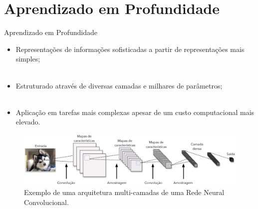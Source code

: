 \section{Aprendizado em Profundidade}
\label{s.deep_learning}

\begin{frame}{Aprendizado em Profundidade}
	\begin{itemize}
		\justifying
		\item Representações de informações sofisticadas a partir de representações mais simples;
		\\~\\
		\item Estruturado através de diversas camadas e milhares de parâmetros;
		\\~\\
		\item Aplicação em tarefas mais complexas apesar de um custo computacional mais elevado.
	\end{itemize}
\end{frame}

\begin{frame}
	\begin{figure}
		\centering
		\includegraphics[scale=0.275]{figs/deep_learning.eps}	
		\caption{Exemplo de uma arquitetura multi-camadas de uma Rede Neural Convolucional.}
		\label{f.deep_learning}
	\end{figure}
\end{frame}
